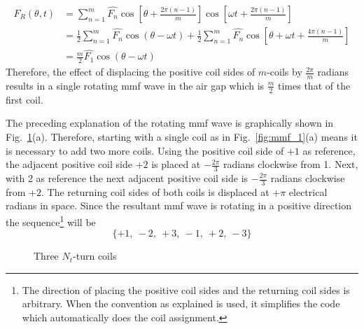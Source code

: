 \begin{equation}
  \label{eqn:F_theta_t_4}
  \begin{aligned}
  F_R(\theta,t)&=\sum_{n=1}^{m}\hat{F_n}\cos\left[\theta+\frac{2\pi(n-1)}{m}\right]
  \cos\left[\omega t +\frac{2\pi(n-1)}{m}\right] \\
  &=\frac{1}{2}\sum_{n=1}^{m}\hat{F_n}\cos(\theta-\omega t)+
  \frac{1}{2}\sum_{n=1}^{m}\hat{F_n}
  \cos\left[\theta+\omega t+\frac{4\pi(n-1)}{m}\right] \\
  &=\frac{m}{2}\hat{F_1}\cos(\theta-\omega t)
  \end{aligned}
\end{equation} 
Therefore, the effect of displacing the positive coil sides of $m$-coils by $\frac{2\pi}{m}$ radians results in a single rotating mmf wave in the air gap which is $\frac{m}{2}$ times that of the first coil.

The preceding explanation of the rotating mmf wave is graphically shown in Fig.~\ref{fig:mmf_2}(a). Therefore, starting with a single coil as in
Fig.~\ref{fig:mmf_1}(a) means it is necessary to add two more coils. Using the positive coil side of $+1$ as reference, the adjacent positive coil side $+2$ is placed at $-\frac{2\pi}{3}$ radians clockwise from \num{+1}. Next, with \num{+2} as reference the next adjacent positive coil side is $-\frac{2\pi}{3}$ radians clockwise from $+2$. The returning coil sides of both coils is displaced at $+\pi$ electrical radians in space. Since the resultant mmf wave is rotating in a positive direction the sequence\footnote{The direction of placing the positive coil sides and the returning coil sides is arbitrary. When the convention as explained is used, it simplifies the code which automatically does the coil assignment.} will be 
\begin{equation}
  \label{eqn:phasebelt_sequence}
  \{+1,\ -2,\ +3,\ -1,\ +2,\  -3\} 
\end{equation}

\begin{figure}
  \centering
  \fontsize{8}{10}\selectfont
  \hfill
  \caption{Three $N_t$-turn coils}
  \label{fig:mmf_2}
\end{figure}

